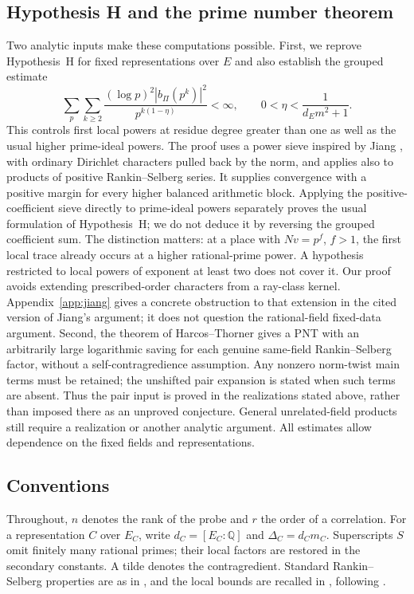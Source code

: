 \documentclass[11pt,reqno]{amsart}
\numberwithin{equation}{section}
\theoremstyle{definition}
\theoremstyle{remark}
\begin{document}
\subsection{Hypothesis H and the prime number theorem}
Two analytic inputs make these computations possible. First, we reprove Hypothesis~H for fixed representations over $E$ and also establish the grouped estimate
\begin{equation}\sum_p\sum_{k\ge2}\frac{(\log p)^2|b_\Pi(p^k)|^2}{p^{k(1-\eta)}}<\infty,\qquad 0<\eta<\frac1{d_Em^2+1}.\label{in:H}\end{equation}
This controls first local powers at residue degree greater than one as well as the usual higher prime-ideal powers. The proof uses a power sieve inspired by Jiang \cite{Jiang}, with ordinary Dirichlet characters pulled back by the norm, and applies also to products of positive Rankin--Selberg series. It supplies convergence with a positive margin for every higher balanced arithmetic block. Applying the positive-coefficient sieve directly to prime-ideal powers separately proves the usual formulation of Hypothesis~H; we do not deduce it by reversing the grouped coefficient sum. The distinction matters: at a place with $Nv=p^f$, $f>1$, the first local trace already occurs at a higher rational-prime power. A hypothesis restricted to local powers of exponent at least two does not cover it. Our proof avoids extending prescribed-order characters from a ray-class kernel. Appendix~\ref{app:jiang} gives a concrete obstruction to that extension in the cited version of Jiang's argument; it does not question the rational-field fixed-data argument. Second, the theorem of Harcos--Thorner \cite{HT} gives a PNT with an arbitrarily large logarithmic saving for each genuine same-field Rankin--Selberg factor, without a self-contragredience assumption. Any nonzero norm-twist main terms must be retained; the unshifted pair expansion is stated when such terms are absent. Thus the pair input is proved in the realizations stated above, rather than imposed there as an unproved conjecture. General unrelated-field products still require a realization or another analytic argument. All estimates allow dependence on the fixed fields and representations.

\subsection{Conventions}
Throughout, $n$ denotes the rank of the probe and $r$ the order of a correlation. For a representation $C$ over $E_C$, write $d_C=[E_C:\mathbb Q]$ and $\Delta_C=d_Cm_C$. Superscripts $S$ omit finitely many rational primes; their local factors are restored in the secondary constants. A tilde denotes the contragredient. Standard Rankin--Selberg properties are as in \cite{JPSS,JS,JSII}, and the local bounds are recalled in \cite[\S3.3]{HT}, following \cite{LRS,MS}.
\end{document}
